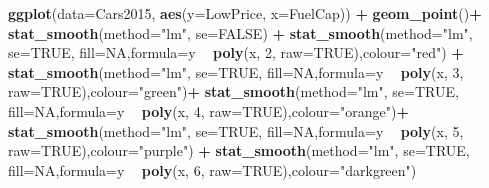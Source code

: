 \documentclass[]{book}
\newenvironment{Shaded}{\begin{snugshade}}{\end{snugshade}}
\newcommand{\KeywordTok}[1]{\textcolor[rgb]{0.13,0.29,0.53}{\textbf{#1}}}
\newcommand{\DataTypeTok}[1]{\textcolor[rgb]{0.13,0.29,0.53}{#1}}
\newcommand{\DecValTok}[1]{\textcolor[rgb]{0.00,0.00,0.81}{#1}}
\newcommand{\StringTok}[1]{\textcolor[rgb]{0.31,0.60,0.02}{#1}}
\newcommand{\OtherTok}[1]{\textcolor[rgb]{0.56,0.35,0.01}{#1}}
\newcommand{\OperatorTok}[1]{\textcolor[rgb]{0.81,0.36,0.00}{\textbf{#1}}}
\newcommand{\NormalTok}[1]{#1}
\begin{document}
\begin{Shaded}
\begin{Highlighting}[]
\KeywordTok{ggplot}\NormalTok{(}\DataTypeTok{data=}\NormalTok{Cars2015, }\KeywordTok{aes}\NormalTok{(}\DataTypeTok{y=}\NormalTok{LowPrice, }\DataTypeTok{x=}\NormalTok{FuelCap)) }\OperatorTok{+}\StringTok{ }\KeywordTok{geom_point}\NormalTok{()}\OperatorTok{+}\StringTok{ }\KeywordTok{stat_smooth}\NormalTok{(}\DataTypeTok{method=}\StringTok{"lm"}\NormalTok{, }\DataTypeTok{se=}\OtherTok{FALSE}\NormalTok{) }\OperatorTok{+}\StringTok{ }\KeywordTok{stat_smooth}\NormalTok{(}\DataTypeTok{method=}\StringTok{"lm"}\NormalTok{, }\DataTypeTok{se=}\OtherTok{TRUE}\NormalTok{, }\DataTypeTok{fill=}\OtherTok{NA}\NormalTok{,}\DataTypeTok{formula=}\NormalTok{y }\OperatorTok{~}\StringTok{ }\KeywordTok{poly}\NormalTok{(x, }\DecValTok{2}\NormalTok{, }\DataTypeTok{raw=}\OtherTok{TRUE}\NormalTok{),}\DataTypeTok{colour=}\StringTok{"red"}\NormalTok{) }\OperatorTok{+}\StringTok{ }\KeywordTok{stat_smooth}\NormalTok{(}\DataTypeTok{method=}\StringTok{"lm"}\NormalTok{, }\DataTypeTok{se=}\OtherTok{TRUE}\NormalTok{, }\DataTypeTok{fill=}\OtherTok{NA}\NormalTok{,}\DataTypeTok{formula=}\NormalTok{y }\OperatorTok{~}\StringTok{ }\KeywordTok{poly}\NormalTok{(x, }\DecValTok{3}\NormalTok{, }\DataTypeTok{raw=}\OtherTok{TRUE}\NormalTok{),}\DataTypeTok{colour=}\StringTok{"green"}\NormalTok{)}\OperatorTok{+}\StringTok{ }\KeywordTok{stat_smooth}\NormalTok{(}\DataTypeTok{method=}\StringTok{"lm"}\NormalTok{, }\DataTypeTok{se=}\OtherTok{TRUE}\NormalTok{, }\DataTypeTok{fill=}\OtherTok{NA}\NormalTok{,}\DataTypeTok{formula=}\NormalTok{y }\OperatorTok{~}\StringTok{ }\KeywordTok{poly}\NormalTok{(x, }\DecValTok{4}\NormalTok{, }\DataTypeTok{raw=}\OtherTok{TRUE}\NormalTok{),}\DataTypeTok{colour=}\StringTok{"orange"}\NormalTok{)}\OperatorTok{+}\StringTok{ }\KeywordTok{stat_smooth}\NormalTok{(}\DataTypeTok{method=}\StringTok{"lm"}\NormalTok{, }\DataTypeTok{se=}\OtherTok{TRUE}\NormalTok{, }\DataTypeTok{fill=}\OtherTok{NA}\NormalTok{,}\DataTypeTok{formula=}\NormalTok{y }\OperatorTok{~}\StringTok{ }\KeywordTok{poly}\NormalTok{(x, }\DecValTok{5}\NormalTok{, }\DataTypeTok{raw=}\OtherTok{TRUE}\NormalTok{),}\DataTypeTok{colour=}\StringTok{"purple"}\NormalTok{) }\OperatorTok{+}\StringTok{ }\KeywordTok{stat_smooth}\NormalTok{(}\DataTypeTok{method=}\StringTok{"lm"}\NormalTok{, }\DataTypeTok{se=}\OtherTok{TRUE}\NormalTok{, }\DataTypeTok{fill=}\OtherTok{NA}\NormalTok{,}\DataTypeTok{formula=}\NormalTok{y }\OperatorTok{~}\StringTok{ }\KeywordTok{poly}\NormalTok{(x, }\DecValTok{6}\NormalTok{, }\DataTypeTok{raw=}\OtherTok{TRUE}\NormalTok{),}\DataTypeTok{colour=}\StringTok{"darkgreen"}\NormalTok{)}
\end{Highlighting}
\end{Shaded}
\end{document}
